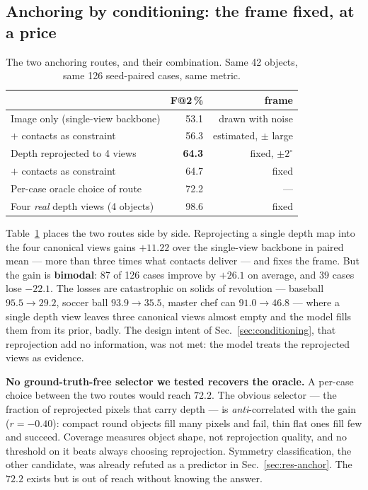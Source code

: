 \documentclass[conference]{IEEEtran}
\makeatletter
\newcommand{\gd}[1]{\textbf{#1}}
\newcommand{\Fs}{F@2\,\%}
\makeatother
\begin{document}
\subsection{Anchoring by conditioning: the frame fixed, at a price}
\label{sec:res-conditioning}

\begin{table}[t]
\centering
\caption{The two anchoring routes, and their combination. Same 42 objects, same
126 seed-paired cases, same metric.}
\label{tab:routes}
\begin{tabular}{lrr}
\toprule
& \Fs & frame \\
\midrule
Image only (single-view backbone) & 53.1 & drawn with noise \\
\quad $+$ contacts as constraint & 56.3 & estimated, $\pm$ large \\
Depth reprojected to 4 views & \gd{64.3} & fixed, $\pm 2^\circ$ \\
\quad $+$ contacts as constraint & 64.7 & fixed \\
\midrule
Per-case oracle choice of route & 72.2 & --- \\
Four \emph{real} depth views (4 objects) & 98.6 & fixed \\
\bottomrule
\end{tabular}
\end{table}

Table~\ref{tab:routes} places the two routes side by side. Reprojecting a single
depth map into the four canonical views gains $+11.22$ over the single-view backbone in
paired mean --- more than three times what contacts deliver --- and fixes the frame.
But the gain is \textbf{bimodal}: 87 of 126 cases improve by $+26.1$ on average, and
39 cases lose $-22.1$. The losses are catastrophic on solids of revolution ---
baseball $95.5 \rightarrow 29.2$, soccer ball $93.9 \rightarrow 35.5$, master chef can
$91.0 \rightarrow 46.8$ --- where a single depth view leaves three canonical views
almost empty and the model fills them from its prior, badly. The design intent of
Sec.~\ref{sec:conditioning}, that reprojection add no information, was not met: the
model treats the reprojected views as evidence.

\textbf{No ground-truth-free selector we tested recovers the oracle.} A per-case
choice between the two routes would reach $72.2$. The obvious selector --- the fraction
of reprojected pixels that carry depth --- is \emph{anti}-correlated with the gain
($r = -0.40$): compact round objects fill many pixels and fail, thin flat ones fill few
and succeed. Coverage measures object shape, not reprojection quality, and no threshold
on it beats always choosing reprojection. Symmetry classification, the other candidate,
was already refuted as a predictor in Sec.~\ref{sec:res-anchor}. The $72.2$ exists but
is out of reach without knowing the answer.
\end{document}
